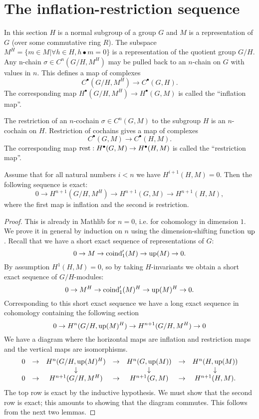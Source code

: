 \section{The inflation-restriction sequence}

In this section $H$ is a normal subgroup of a group $G$ and $M$ is
a representation of $G$ (over some commutative ring $R$).
The subspace $M^H = \{m \in M | \forall h \in H, h \bullet m = 0\}$ is
a representation of the quotient group $G / H$.
Any n-chain $\sigma \in C^n(G/H,M^H)$ may be pulled back to an
$n$-chain on $G$ with values in $n$. This defines a map of complexes
\[
	C^\bullet(G/H, M^H) \to C^\bullet(G,H).
\]
The corresponding map $H^\bullet(G/H, M^H) \to H^\bullet(G,M)$ is called the ``inflation map''.

The restriction of an $n$-cochain $\sigma\in C^n(G,M)$ to the subgroup  $H$ is an $n$-cochain on $H$. Restriction of cochains gives a map of complexes
\[
	C^\bullet(G,M) \to C^\bullet(H,M).
\]
The corresponding map $\mathrm{rest} : H^\bullet(G,M) \to H^\bullet(H,M)$ is called the ``restriction map''.


\begin{theorem}
	Assume that for all natural numbers $i < n$ we have $H^{i+1}(H,M)=0$.
	Then the following sequence is exact:
	\[
		0 \to H^{n+1}(G/H, M^H) \to H^{n+1}(G,M) \to H^{n+1}(H,M),
	\]
	where the first map is inflation and the second is restriction.
\end{theorem}

\begin{proof}
	This is already in Mathlib for $n=0$, i.e. for cohomology in
	dimension $1$.
	We prove it in general by induction on $n$ using the dimension-shifting function $\mathrm{up}$.
	Recall that we have a short exact sequence of representations of $G$:
	\[
		0 \to M \to \mathrm{coind}_1'(M) \to \mathrm{up}(M) \to 0.
	\]
	By assumption $H^1(H,M)=0$, so by taking $H$-invariants we obtain a short exact sequence of $G/H$-modules:
	\[
		0 \to M^H \to \mathrm{coind}_1'(M)^H \to \mathrm{up}(M)^H \to 0.
	\]
	Corresponding to this short exact sequence we have a long exact sequence in cohomology
	containing the following section
	\[
		 0 \to H^n(G/H, \mathrm{up}(M)^H) \to  H^{n+1}(G/H, M^H) \to 0
	\]
	We have a diagram where the horizontal maps are inflation and restriction maps and the vertical
	maps are isomorphisms.
	\[
		\begin{matrix}
			0 &\to& H^{n}(G/H, \mathrm{up}(M)^H) &\to &H^{n}(G,\mathrm{up}(M)) & \to & H^n(H,\mathrm{up}(M)) \\
			  &   &   \downarrow              &    &  \downarrow         &     &  \downarrow  \\
			0 &\to& H^{n+1}(G/H, M^H) &\to &H^{n+1}(G,M) & \to & H^{n+1}(H,M).
		\end{matrix}
	\]
	The top row is exact by the inductive hypothesis.
	We must show that the second row is exact; this amounts to showing that the diagram commutes.
	This follows from the next two lemmas.
\end{proof}

